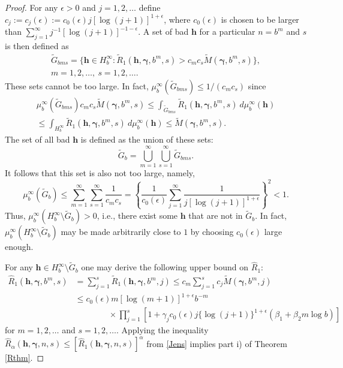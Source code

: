 \documentclass{article}
\renewcommand{\vec}[1]{\ensuremath{\mathbf{#1}}}
\newcommand{\vecsym}[1]{\ensuremath{\boldsymbol{#1}}}
\newcommand{\bfgam}{\vecsym \gamma}
\newcommand{\h}{\vec h}
\begin{document}
\begin{proof}
For any $\epsilon > 0$ and $j=1,2,\ldots$ define $c_{j}:= c_j(\epsilon):= c_{0}(\epsilon) j
[\log(j+1)]^{1+\epsilon}$, where $c_{0}(\epsilon)$ is chosen to be
larger than $\sum_{j=1}^{\infty} j^{-1} [\log(j+1)]^{-1-\epsilon}$.  A
set of bad $\h$ for a particular $n=b^{m}$ and $s$ is then defined as
\begin{multline*}
\tilde{G}_{bms} = \{ \h \in H_{b}^{\infty} :
\tilde{R}_{1}(\h,\bfgam,b^{m},s) > c_{m}c_{s}
\tilde{M}(\bfgam,b^{m},s) \},\\
m=1, 2, \ldots, \ s=1,
2, \ldots.
\end{multline*}
These sets cannot be too large.  In fact, $\mu_{b}^{\infty}(\tilde{G}_{bms})
 \le
1/(c_{m}c_{s})$ since
\begin{multline*}
\mu_{b}^{\infty}(\tilde{G}_{bms}) c_{m}c_{s} \tilde{M}(\bfgam,b^{m},s) \le
\int_{\tilde{G}_{bms}} \tilde{R}_{1}(\h,\bfgam,b^{m},s) \ d\mu_{b}^{\infty}(\h)
\\
\le \int_{H_{b}^{\infty}} \tilde{R}_{1}(\h,\bfgam,b^{m},s) \
d\mu_{b}^{\infty}(\h) \le \tilde{M}(\bfgam,b^{m},s).
\end{multline*}
The set of all bad $\h$ is defined as the union of these sets:  
$$
\tilde{G}_{b} = \bigcup_{m=1}^{\infty} \bigcup_{s=1}^{\infty} \tilde{G}_{bms}. 
$$
It follows that this set is also not too large, namely,
$$
\mu_{b}^{\infty}(\tilde{G}_{b}) \le \sum_{m=1}^{\infty}
\sum_{s=1}^{\infty} \frac{1}{c_{m}c_{s}} = \left \{ \frac 1{c_{0}(\epsilon)}
\sum_{j=1}^{\infty} \frac{1}{ j [\log(j+1)]^{1+\epsilon}} \right 
\}^{2} < 1.
$$
Thus, $\mu_{b}^{\infty}(H_{b}^{\infty} \setminus \tilde{G}_{b}) >0$, i.e., there exist 
some $\h$ that are not in $\tilde{G}_{b}$.  In fact, 
$\mu_{b}^{\infty}(H_{b}^{\infty} \setminus \tilde{G}_{b})$ may be made arbitrarily close 
to $1$ by choosing $c_{0}(\epsilon)$ large enough.

For any $\h \in H_{b}^{\infty} \setminus \tilde{G}_{b}$ one may derive the following 
upper bound on $\hat{R}_1$:
\begin{align*}
    \hat{R}_{1}(\h,\bfgam,b^m,s) &= \sum_{j=1}^{s}
    \tilde{R}_{1}(\h,\bfgam,b^{m},j) \le c_{m} \sum_{j=1}^{s} c_{j}
    \tilde{M}(\bfgam,b^{m},j) \\
   & \le c_{0}(\epsilon) m [\log(m+1)]^{1+\epsilon} b^{-m} \\
   & \qquad \qquad \times \prod_{j=1}^{s} [1 + \gamma_{j}
   c_{0}(\epsilon) j \{\log(j+1)\}^{1+\epsilon} (\beta_{1} + \beta_{2} m \log b
   ) ]
\end{align*}
for $m=1,2, \ldots$ and $s=1,2, \ldots$.  Applying the inequality
$\hat{R}_{\alpha}(\h,\bfgam,n,s)\le
[\hat{R}_{1}(\h,\bfgam,n,s)]^{\alpha}$ from \eqref{Jens} implies part
i) of Theorem \ref{Rthm}.


\end{proof}
\end{document}
